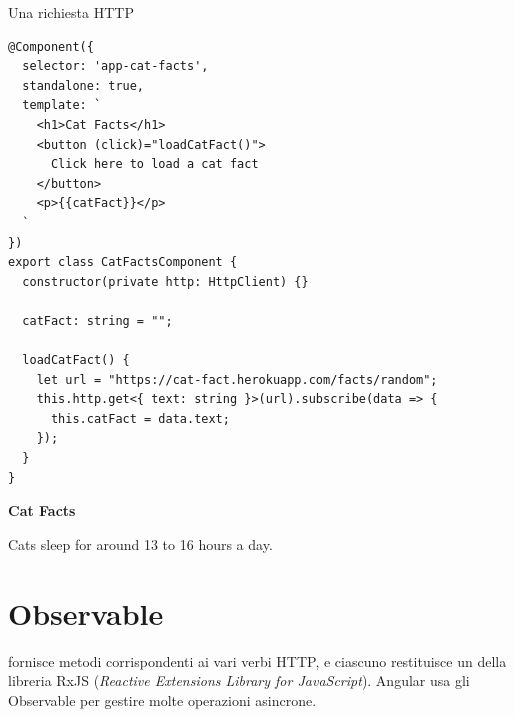 \begin{esempio}{Una richiesta HTTP}
\begin{affianco}[0.5][c]
\codicepiccolo
\begin{lstlisting}[style=ts, name=cat-facts.component.ts]
@Component({
  selector: 'app-cat-facts',
  standalone: true,
  template: `
    <h1>Cat Facts</h1>
    <button (click)="loadCatFact()">
      Click here to load a cat fact
    </button>
    <p>{{catFact}}</p>
  `
})
export class CatFactsComponent {
  constructor(private http: HttpClient) {}

  catFact: string = "";

  loadCatFact() {
    let url = "https://cat-fact.herokuapp.com/facts/random";
    this.http.get<{ text: string }>(url).subscribe(data => {
      this.catFact = data.text;
    });
  }
}
\end{lstlisting}
\risultato
\begin{browser}[localhost:4200]
  {\Lora\bfseries\LARGE Cat Facts\par}\vspace{6pt}
  \par\vspace{6pt}
  Cats sleep for around 13 to 16 hours a day.
\end{browser}
\begin{immagine}
\end{immagine}
\end{affianco}
\end{esempio}

\section{Observable}

 fornisce metodi corrispondenti ai vari verbi HTTP, e ciascuno
restituisce un  della libreria RxJS (\textit{Reactive
Extensions Library for JavaScript}). Angular usa gli Observable per gestire
molte operazioni asincrone.

